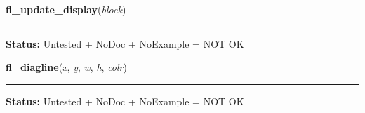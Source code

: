     \label{xformslib:library:fl_update_display}

    \vspace{0.5ex}

\hspace{.8\funcindent}\begin{boxedminipage}{\funcwidth}

    \raggedright \textbf{fl\_update\_display}(\textit{block})

    \vspace{-1.5ex}

    \rule{\textwidth}{0.5\fboxrule}
\setlength{\parskip}{2ex}
\setlength{\parskip}{1ex}
\textbf{Status:} Untested + NoDoc + NoExample = NOT OK



    \end{boxedminipage}

    \label{xformslib:library:fl_diagline}

    \vspace{0.5ex}

\hspace{.8\funcindent}\begin{boxedminipage}{\funcwidth}

    \raggedright \textbf{fl\_diagline}(\textit{x}, \textit{y}, \textit{w}, \textit{h}, \textit{colr})

    \vspace{-1.5ex}

    \rule{\textwidth}{0.5\fboxrule}
\setlength{\parskip}{2ex}
\setlength{\parskip}{1ex}
\textbf{Status:} Untested + NoDoc + NoExample = NOT OK



    \end{boxedminipage}

    \label{xformslib:library:fl_linewidth}

    \vspace{0.5ex}

